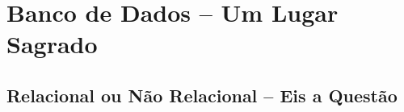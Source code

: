 \chapter{Banco de Dados -- Um Lugar Sagrado}

\section{Relacional ou Não Relacional -- Eis a Questão}